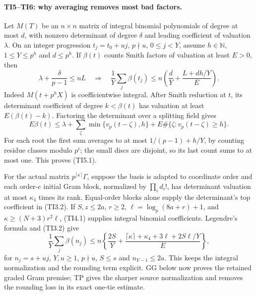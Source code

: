 \documentclass[11pt,a4paper]{article}
\numberwithin{equation}{section}
\theoremstyle{remark}\newtheorem{remark}[theorem]{Remark}
\begin{document}
\paragraph{TI5--TI6: why averaging removes most bad factors.}
Let $M(T)$ be an $n\times n$ matrix of integral binomial polynomials of
degree at most $d$, with nonzero determinant of degree $\delta$ and
leading coefficient of valuation $\lambda$.
On an integer progression $t_j=t_0+uj$, $p\nmid u$, $0\leq j<Y$, assume
$h\in\mathbb N$, $1\leq Y\leq p^h$ and $d\leq p^h$.
If $\beta(t)$ counts Smith factors of valuation at
least $E>0$, then
\[
 \lambda+\frac\delta{p-1}\leq nL
 \quad\Longrightarrow\quad
 \frac1Y\sum_j\beta(t_j)
 \leq n\left(\frac dY+\frac{L+dh/Y}{E}\right).
 \tag{TI5.1}
\]
Indeed $M(t+p^hX)$ is coefficientwise integral.  After Smith reduction at
$t$, its determinant coefficient of degree $k<\beta(t)$ has valuation
at least $E(\beta(t)-k)$.
Factoring the determinant over a splitting field gives
\[
 E\beta(t)\leq\lambda+\sum_\zeta\min\{v_p(t-\zeta),h\}
       +E\#\{\zeta:v_p(t-\zeta)\geq h\}.
\]
For each root the first sum averages to at most $1/(p-1)+h/Y$,
by counting residue classes modulo $p^i$; the small discs are disjoint,
so its last count sums to at most one. This proves (TI5.1).

For the actual matrix $p^{\lceil\kappa\rceil}\Gamma$, suppose the basis is
adapted to coordinate order and each order-$e$ initial Gram block, normalized
by $\prod_i d_i!$, has determinant valuation at most $\kappa_4$ times its rank.
Equal-order blocks alone supply the determinant's top coefficient in (TI3.2).
If $S,z\leq2a$, $r\geq2$, $\ell=\log_p(8a+r)+1$, and
$\kappa\geq(N+3)r^2\ell$, (TI4.1) supplies integral binomial coefficients.
Legendre's formula and (TI3.2) give
\[
 \frac1Y\sum_j\beta(n_j)
 \leq n\left\{\frac{2S}Y+
 \frac{\lceil\kappa\rceil+\kappa_4+3\ell+2S\ell/Y}{E}\right\},
 \tag{TI6.1}
\]
for $n_j=s+uj$, $Y,u\geq1$, $p\nmid u$, $S\leq s$ and $n_{Y-1}\leq2a$.
This keeps the integral normalization and the rounding term explicit.
GG below now proves the retained graded Gram premise; TP gives the
sharper source normalization and removes the rounding loss in its exact
one-tie estimate.
\end{document}

